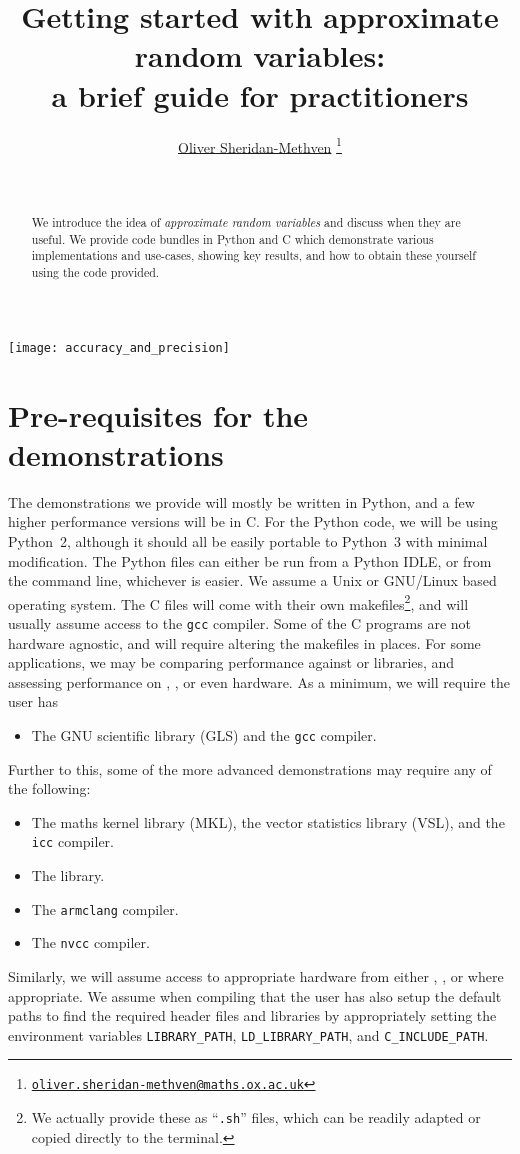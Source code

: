 \documentclass[11pt,a4paper,twoside,english]{extarticle}
\title{\bfseries Getting started with approximate random variables:\\[0.5em] a brief guide for practitioners}
\author{\href{mailto:oliver.sheridan-methven@maths.ox.ac.uk}{Oliver Sheridan-Methven}%
\thanks{\href{mailto:oliver.sheridan-methven@maths.ox.ac.uk}%
{\texttt{oliver.sheridan-methven@maths.ox.ac.uk}}}
}
\date{\datedayname\ \nth{\number\day} \monthname\  \number\year}
\begin{document}
\linenumbers
\pagestyle{empty}
\maketitle
{}

\begin{abstract}
We introduce the idea of \emph{approximate random variables} and discuss when they are useful. We provide code bundles in Python and C which demonstrate various implementations and use-cases, showing key results, and how to obtain these yourself using the code provided.  
\end{abstract}


\vfill
\centerline{\texttt{[image: accuracy\_and\_precision]}}
\vfill

\clearpage
\tableofcontents
\cleardoublepage
{}
\pagestyle{fancy}

\clearpage
\section{Pre-requisites for the demonstrations}

The demonstrations we provide will mostly be written in Python, and a few higher performance versions will be in C. For the Python code, we will be using Python~2, although it should all be easily portable to Python~3 with minimal modification. The Python files can either be run from a Python IDLE, or from the command line, whichever is easier. We assume a Unix or GNU/Linux based operating system. The C files will come with their own makefiles\footnote{We actually provide these as ``\verb|.sh|'' files, which can be readily adapted or copied directly to the terminal.}, and will usually assume access to the \texttt{gcc} compiler. Some of the C programs are not hardware agnostic, and will require altering the makefiles in places. For some applications, we may be comparing performance against \intel or \nag libraries, and assessing performance on \intel, \arm, or even \nvidia hardware. As a minimum, we will require the user has 
\begin{itemize}
\item The GNU scientific library (GLS) and the \texttt{gcc} compiler.
\end{itemize}
Further to this, some of the more advanced demonstrations may require any of the following:
\begin{itemize}
\item The \intel maths kernel library (MKL), the vector statistics library (VSL), and the \texttt{icc} compiler. 
\item The \nag library. 
\item The \arm \texttt{armclang} compiler.
\item The \nvidia \texttt{nvcc} compiler.
\end{itemize} 
Similarly, we will assume access to appropriate hardware from either \intel, \arm, or \nvidia where appropriate. We assume when compiling that the user has also setup the default paths to find the required header files and libraries by appropriately setting the environment variables \verb|LIBRARY_PATH|, \verb|LD_LIBRARY_PATH|, and \verb|C_INCLUDE_PATH|.
\end{document}
